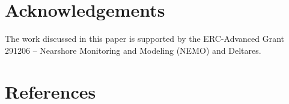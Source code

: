 \documentclass[preprint,12pt,authoryear,a4paper]{elsarticle}
\providecommand{\DIFaddbegin}{} %
\providecommand{\DIFaddend}{} %
\providecommand{\DIFdelbegin}{} %
\providecommand{\DIFdelend}{} %
\begin{document}
\section*{Acknowledgements}
The work discussed in this paper is supported by the ERC-Advanced
Grant 291206 -- Nearshore Monitoring and Modeling (NEMO) and Deltares.

\section*{References}

\DIFdelbegin %
\DIFdelend \DIFaddbegin {}
\DIFaddend 
\end{document}
